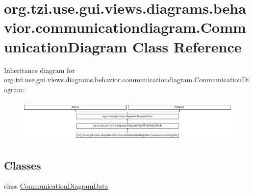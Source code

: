 \hypertarget{classorg_1_1tzi_1_1use_1_1gui_1_1views_1_1diagrams_1_1behavior_1_1communicationdiagram_1_1_communication_diagram}{\section{org.\-tzi.\-use.\-gui.\-views.\-diagrams.\-behavior.\-communicationdiagram.\-Communication\-Diagram Class Reference}
\label{classorg_1_1tzi_1_1use_1_1gui_1_1views_1_1diagrams_1_1behavior_1_1communicationdiagram_1_1_communication_diagram}
}
Inheritance diagram for org.\-tzi.\-use.\-gui.\-views.\-diagrams.\-behavior.\-communicationdiagram.\-Communication\-Diagram\-:\begin{figure}[H]
\begin{center}
\leavevmode
\includegraphics[height=2.183236cm]{classorg_1_1tzi_1_1use_1_1gui_1_1views_1_1diagrams_1_1behavior_1_1communicationdiagram_1_1_communication_diagram}
\end{center}
\end{figure}
\subsection*{Classes}
\begin{DoxyCompactItemize}
\item 
class \hyperlink{classorg_1_1tzi_1_1use_1_1gui_1_1views_1_1diagrams_1_1behavior_1_1communicationdiagram_1_1_commufbba68d0542edec6da2ea3d0e02dfce8}{Communication\-Diagram\-Data}
\end{DoxyCompactItemize}
